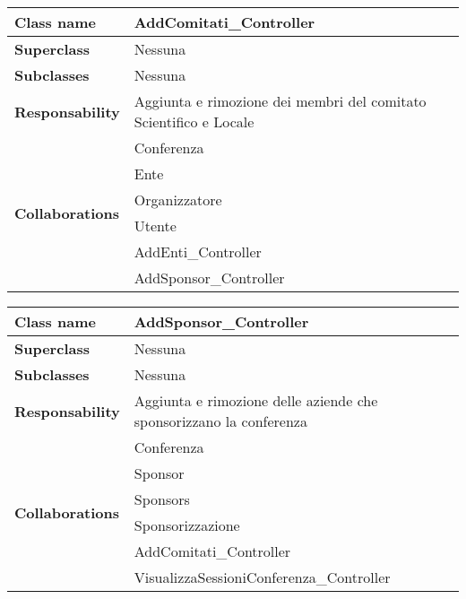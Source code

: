\begin{table}[h!]
	\begin{tabular}{|l|l|}
		\hline 
		\textbf{Class name} & AddComitati\_Controller
		\\ \hline
		\textbf{Superclass} & Nessuna
		\\ \hline
		\multirow{1}{*}{\textbf{Subclasses}} & Nessuna
		\\ \hline
		\textbf{Responsability} & Aggiunta e rimozione dei membri del comitato Scientifico e Locale
		\\ \hline
		\multirow{6}{*}{\textbf{Collaborations}} & Conferenza \\
		& Ente\\
		& Organizzatore\\
		& Utente\\
		& AddEnti\_Controller\\
		& AddSponsor\_Controller
		\\ \hline
	\end{tabular}
\end{table}
\newpage
\begin{table}[h!]
	\begin{tabular}{|l|l|}
		\hline 
		\textbf{Class name} & AddSponsor\_Controller
		\\ \hline
		\textbf{Superclass} & Nessuna
		\\ \hline
		\multirow{1}{*}{\textbf{Subclasses}} & Nessuna
		\\ \hline
		\textbf{Responsability} & Aggiunta e rimozione delle aziende che sponsorizzano la conferenza
		\\ \hline
		\multirow{6}{*}{\textbf{Collaborations}} & Conferenza \\
		& Sponsor\\
		& Sponsors\\
		& Sponsorizzazione\\
		& AddComitati\_Controller\\
		& VisualizzaSessioniConferenza\_Controller
		\\ \hline
	\end{tabular}
\end{table}

